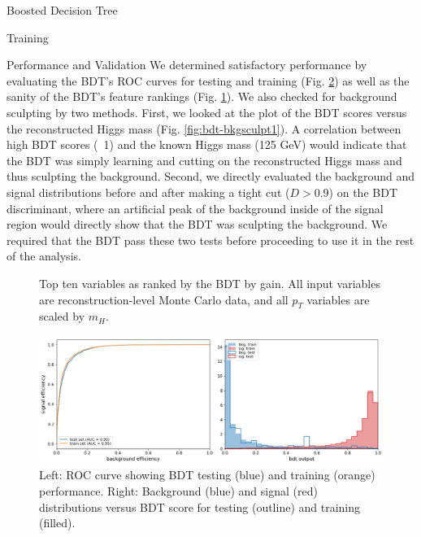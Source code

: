 \begin{section}{Boosted Decision Tree}
\begin{subsection}{Training}
\end{subsection}
\begin{subsection}{Performance and Validation}
We determined satisfactory performance by evaluating the BDT's ROC curves for testing and training (Fig. \ref{fig:bdt-performance}) as well as the sanity of the BDT's feature rankings (Fig. \ref{fig:bdt-vars}). We also checked for background sculpting by two methods. First, we looked at the plot of the BDT scores versus the reconstructed Higgs mass (Fig. \ref{fig:bdt-bkgsculpt1}). A correlation between high BDT scores (~1) and the known Higgs mass (125 GeV) would indicate that the BDT was simply learning and cutting on the reconstructed Higgs mass and thus sculpting the background. Second, we directly evaluated the background and signal distributions before and after making a tight cut ($D > 0.9$) on the BDT discriminant, where an artificial peak of the background inside of the signal region would directly show that the BDT was sculpting the background. We required that the BDT pass these two tests before proceeding to use it in the rest of the analysis.

\begin{figure}[htb]
\begin{center}

\end{center}
\caption{Top ten variables as ranked by the BDT by gain. All input variables are reconstruction-level Monte Carlo data, and all $p_{T}$ variables are scaled by $m_{H}.$}
\label{fig:bdt-vars}
\end{figure}

\begin{figure}[htb]
\begin{center}
\includegraphics[width=.95\linewidth]{Dissertation/fig/bdt-performance.png}
\end{center}
\caption{Left: ROC curve showing BDT testing (blue) and training (orange) performance. Right: Background (blue) and signal (red) distributions versus BDT score for testing (outline) and training (filled).}
\label{fig:bdt-performance}
\end{figure}


\end{subsection}
\end{section}
